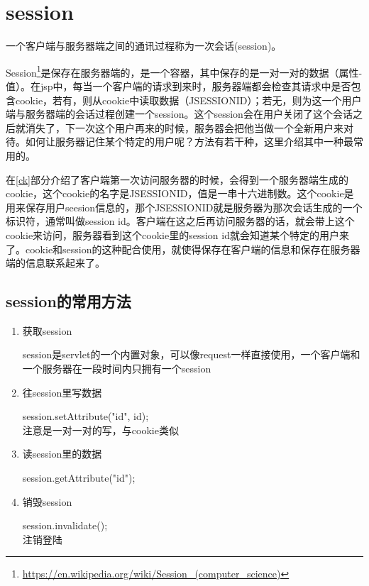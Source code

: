 \section{session}

一个客户端与服务器端之间的通讯过程称为一次会话(session)。

Session\footnote{\url{https://en.wikipedia.org/wiki/Session_(computer_science)}}是保存在服务器端的，是一个容器，其中保存的是一对一对的数据（属性-值）。在jsp中，每当一个客户端的请求到来时，服务器端都会检查其请求中是否包含cookie，若有，则从cookie中读取数据（JSESSIONID）；若无，则为这一个用户端与服务器端的会话过程创建一个session。这个session会在用户关闭了这个会话之后就消失了，下一次这个用户再来的时候，服务器会把他当做一个全新用户来对待。如何让服务器记住某个特定的用户呢？方法有若干种，这里介绍其中一种最常用的。

在\ref{ck}部分介绍了客户端第一次访问服务器的时候，会得到一个服务器端生成的cookie，这个cookie的名字是JSESSIONID，值是一串十六进制数。这个cookie是用来保存用户seesion信息的，那个JSESSIONID就是服务器为那次会话生成的一个标识符，通常叫做session id。客户端在这之后再访问服务器的话，就会带上这个cookie来访问，服务器看到这个cookie里的session id就会知道某个特定的用户来了。cookie和session的这种配合使用，就使得保存在客户端的信息和保存在服务器端的信息联系起来了。
\subsection{session的常用方法}
\begin{enumerate}
\item
获取session

session是servlet的一个内置对象，可以像request一样直接使用，一个客户端和一个服务器在一段时间内只拥有一个session
\item
往session里写数据

session.setAttribute("id", id);\\注意是一对一对的写，与cookie类似

\item
读session里的数据

session.getAttribute("id");
\item
销毁session

session.invalidate();\\注销登陆
\end{enumerate}
